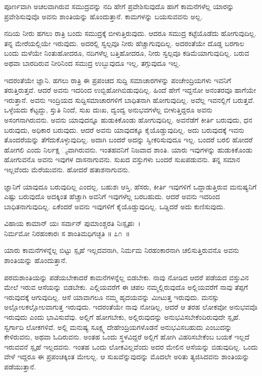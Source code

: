 \begin{artha}
ಪೂರ್ಣವಾಗಿ ಅಚಲವಾಗಿರುವ ಸಮುದ್ರವನ್ನು ನದಿ ಹೇಗೆ ಪ್ರವೇಶಿಸುವುದೊ ಹಾಗೆ ಕಾಮನೆಗಳೆಲ್ಲ ಯಾರನ್ನು ಪ್ರವೇಶಿಸುವುವೊ ಅವನು ಶಾಂತಿಯನ್ನು ಹೊಂದುತ್ತಾನೆ. ಕಾಮಗಳನ್ನು ಬಯಸುವವನು ಅಲ್ಲ.
\end{artha}

ನದಿಯ ನೀರು ಹಗಲು ರಾತ್ರಿ ಬಂದು ಸಮುದ್ರಕ್ಕೆ ಬೀಳುತ್ತಿರುವುದು. ಆದರೂ ಸಮುದ್ರ ಕಟ್ಟೆಯೊಡೆದು ಹೋಗುವುದಿಲ್ಲ. ತನ್ನ ಮೇರೆಯಲ್ಲಿಯೇ ಇರುವುದು. ಅದರಲ್ಲಿ ಸ್ವಲ್ಪವೂ ನೀರು ಹೆಚ್ಚಾಗುವುದಿಲ್ಲ. ಅದರಂತೆಯೇ ದೊಡ್ಡ ಬರಗಾಲ ಬಂದು ಮಳೆಯೇ ನಿಂತುಹೋದರೂ, ನದಿಗಳೆಲ್ಲ ಬತ್ತಿಹೋದರೂ, ನೀರು ಸ್ವಲ್ಪವೂ ಕಡಿಮೆಯಾಗುವುದಿಲ್ಲ. ಬರುವ ಅಥವಾ ಬಾರದಿರುವ ನೀರಿನಿಂದ ಸಮುದ್ರ ಉಬ್ಬುವುದೂ ಇಲ್ಲ, ತಗ್ಗುವುದೂ ಇಲ್ಲ.

ಇದರಂತೆಯೇ ಜ್ಞಾನಿ. ಹಗಲು ರಾತ್ರಿ ಈ ಪ್ರಪಂಚದ ಸುದ್ದಿ ಸಮಾಚಾರಗಳನ್ನು ಪಂಚೇಂದ್ರಿಯಗಳು ಇವನಿಗೆ ತರುತ್ತಿರುತ್ತವೆ. ಆದರೆ ಅವನು ಇದರಿಂದ ಉಬ್ಬಿಹೋಗಿಬಿಡುವುದಿಲ್ಲ. ಹಿಂದೆ ಹೇಗೆ ಇದ್ದನೋ ಅನಂತರವೂ ಹಾಗೆಯೇ ಇರುತ್ತಾನೆ. ಅವನು ಇಂದ್ರಿಯದ ಸುದ್ದಿಸಮಾಚಾರಗಳಿಗೆ ಬಾಧಿತನಾಗಿ ಹೋಗುವುದಿಲ್ಲ. ಅವೆಲ್ಲ ಇವನಲ್ಲಿಗೆ ಬರುತ್ತವೆ. ಒಳ್ಳೆಯದು ಕೆಟ್ಟದ್ದು, ಸ್ತುತಿ ನಿಂದೆ, ಸುಖ ದುಃಖ, ದ್ವಂದ್ವ ಅನುಭವಗಳೆಲ್ಲ ಬೀಳುತ್ತಿದ್ದರೂ ಅವನು ಅಸಂಗನಾಗಿರುವನು. ಅವನು ಯಾವುದನ್ನೂ ಹುಡುಕಿಕೊಂಡು ಹೋಗುವುದಿಲ್ಲ. ಅವನೆಡೆಗೆ ಕೀರ್ತಿ ಬರುವುದು, ಧನ ಬರುವುದು, ಅಧಿಕಾರ ಬರುವುದು. ಆದರೆ ಅವನು ಯಾವುದಕ್ಕೂ ಕೈಯೊಡ್ಡುವುದಿಲ್ಲ. ಅದು ಬರುವುದಕ್ಕೆ ಇವನು ತೊಂದರೆಯನ್ನು ತೆಗೆದುಕೊಳ್ಳುವುದಿಲ್ಲ. ಅದಾಗಿ ಬಂದರೆ ಅದನ್ನು ಸ್ವೀಕರಿಸುವುದೂ ಇಲ್ಲ. ಬಂದರೆ ಬರಲಿ ಹೋದರೆ ಹೋಗಲಿ ಎಂದು ನಿರ್ಲಕ್ಷ ್ಯವಾಗಿರುವನು. ಇಂತಹವನಿಗೆ ನಿಜವಾದ ಶಾಂತಿ. ಯಾರು ಇವುಗಳನ್ನು ಹುಡುಕಿಕೊಂಡು ಹೋಗುವನೊ ಅವನು ಇವುಗಳ ದಾಸನಾಗುವನು. ಸುಖದ ವಸ್ತುಗಳು ಬಂದರೆ ಸುಖಪಡುವನು. ತನ್ನ ಸಮಾನ ಇಲ್ಲವೆಂದು ಮೆರೆಯುವನು. ಹೋದರೆ ಹತಾಶನಾಗುವನು.

ಜ್ಞಾನಿಗೆ ಯಾವುದೂ ಬರುವುದಿಲ್ಲ ಎಂದಲ್ಲ. ಬಹುಶಃ ಆಸ್ತಿ, ಹೆಸರು, ಕೀರ್ತಿ ಇವುಗಳಿಗೆ ಒದ್ದಾಡುತ್ತಿರುವ ಮನುಷ್ಯನಿಗೆ ಎಷ್ಟು ಬರುವುದೊ ಅದಕ್ಕಿಂತ ಹೆಚ್ಚಾಗಿ ಅವನಿಗೆ ಇವುಗಳೆಲ್ಲ ಬರಬಹುದು. ಆದರೆ ಅವನು ಇದರಿಂದ ಬಾಧಿತನಾಗುವುದಿಲ್ಲ. ಏಕೆಂದರೆ ಅವನು ಇವುಗಳಿಗೆ ಕೈಯೊಡ್ಡುವುದಿಲ್ಲ. ಒಡ್ಡಿದರೆ ಅದು ಕುಣಿಸುವುದು.

\begin{shloka}
ವಿಹಾಯ ಕಾಮಾನ್ ಯಃ ಸರ್ವಾನ್ ಪುಮಾಂಶ್ಚರತಿ ನಿಃಸ್ಪೃಹಃ~।\\ನಿರ್ಮಮೋ ನಿರಹಂಕಾರಃ ಸ ಶಾಂತಿಮಧಿಗಚ್ಛತಿ \hfill॥ ೭೧~॥
\end{shloka}

\begin{artha}
ಯಾರು ಕಾಮನೆಗಳನ್ನೆಲ್ಲ ಬಿಟ್ಟು ಸ್ಪೃಹೆ ಇಲ್ಲದವನಾಗಿ, ನಿರ್ಮಮ ನಿರಹಂಕಾರನಾಗಿ ಚಲಿಸುತ್ತಿರುವನೊ ಅವನು ಶಾಂತಿಯನ್ನು ಹೊಂದುತ್ತಾನೆ.
\end{artha}

ಪರಮಶಾಂತಿಯನ್ನು ಪಡೆಯಬೇಕಾದರೆ ಕಾಮನೆಗಳನ್ನೆಲ್ಲ ಬಿಡಬೇಕು. ನಾವು ನೋಡಿದ ಆದರೆ ಪಡೆಯದ ವಸ್ತುವಿನ ಮೇಲೆ ಇರುವ ಆಸೆಯನ್ನು ಬಿಡಬೇಕು. ಎಲ್ಲಿಯವರೆಗೆ ಈ ಚಪಲ ನಮ್ಮಲ್ಲಿರುವುದೊ ಅಲ್ಲಿಯವರೆಗೆ ನಾವು ತೆಪ್ಪಗೆ ಇರುವುದಕ್ಕೆ ಆಗುವುದಿಲ್ಲ. ಆಸೆ ಯಾವಾಗಲೂ ನಮ್ಮ ಹೃದಯವನ್ನು ಮೀಟುತ್ತ ಇರುವುದು. ಮನಸ್ಸು ಅಲ್ಲೋಲಕಲ್ಲೋಲವಾಗುತ್ತ ಇರುವುದು. ಇದರಂತೆಯೇ ನಾವು ನೋಡಿಲ್ಲ, ಆದರೆ ಆ ತರಹ ಲೋಕವೋ ಅನುಭವವೊ ಇರುವುದು ಎಂದು ಭಾವಿಸುವೆವು. ಅಲ್ಲಿಗೆ ಹೋಗಬೇಕು, ಅಲ್ಲಿರುವುದನ್ನು ಅನುಭವಿಸಬೇಕೆಂದಿರುವುದೇ ಸ್ಪೃಹೆ. ಸ್ವರ್ಗಾದಿ ಲೋಕಗಳಿವೆ. ಅಲ್ಲಿ ಮನುಷ್ಯ ಸೂಕ್ಷ್ಮ ದೇಹೇಂದ್ರಿಯಗಳೊಡನೆ ಅನುಭವಿಸಬಹುದು ಎಂಬುದನ್ನು ಕೇಳಿರುವನು, ಅಥವಾ ಓದಿರುವನು. ಅಂತಹ ಒಂದು ಸ್ಥಳವಿದ್ದರೆ ಅಲ್ಲಿಗೆ ಹೋಗಿ ವಿಹರಿಸಬೇಕೆಂಬ ಬಯಕೆ ಇಲ್ಲದೆ ಇರುವವನೆ ಸ್ಪೃಹೆ ಇಲ್ಲದವನು. ಇಂತಹ ಒಂದು ಲೋಕವಿಲ್ಲವೆಂದು ಅದರ ಮೇಲಿನ ಆಸೆಯನ್ನು ಬಿಡುವುದಿಲ್ಲ. ಒಂದು ವೇಳೆ ಇದ್ದರೂ ಈ ಪ್ರಪಂಚಕ್ಕಿಂತ ಮೇಲಲ್ಲ. ಆ ಸುಖವೆನ್ನುವುದನ್ನು ಮೊದಲೇ ಅರಿತು ತ್ಯಜಿಸಿದವನು ಶಾಂತಿಯನ್ನು ಪಡೆಯುತ್ತಾನೆ.

